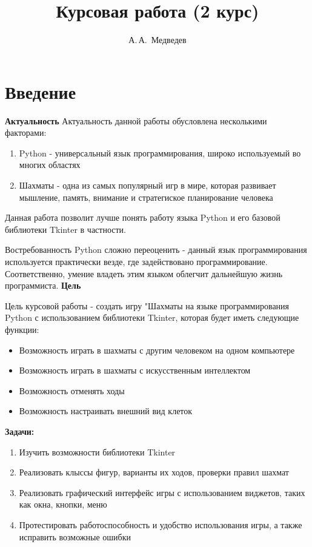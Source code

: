 \documentclass[14pt, oneside]{altsu-report}
\title{Курсовая работа (2 курс)}
\author{А.\,А.~Медведев}
\institute{Институт цифровых технологий, электроники и физики}
\date{\the\year}
\begin{document}
\maketitle

\setcounter{page}{2}
\makeabstract
\tableofcontents

\chapter*{Введение}

\textbf{Актуальность}
Актуальность данной работы обусловлена несколькими факторами:
\begin{enumerate}
    \item Python - универсальный язык программирования, широко используемый во многих областях
    \item Шахматы - одна из самых популярный игр в мире, которая развивает мышление, память, внимание и стратегиское планирование человека
\end{enumerate}

Данная работа позволит лучше понять работу языка Python и его базовой библиотеки Tkinter в частности.

Востребованность Python сложно переоценить - данный язык программирования используется практически везде, где задействовано программирование. Соответственно, умение владеть этим языком облегчит дальнейшую жизнь программиста.
\textbf{Цель}

Цель курсовой работы - создать игру "Шахматы на языке программирования Python с использованием библиотеки Tkinter, которая будет иметь следующие функции:
\begin{itemize}
    \item Возможность играть в шахматы с другим человеком на одном компьютере
    \item Возможность играть в шахматы с искусственным интеллектом
    \item Возможность отменять ходы
    \item Возможность настраивать внешний вид клеток
\end{itemize}
\textbf{Задачи:}
\begin{enumerate}
\item Изучить возможности библиотеки Tkinter
\item Реализовать клыссы фигур, варианты их ходов, проверки правил шахмат
\item Реализовать графический интерфейс игры с использованием виджетов, таких как окна, кнопки, меню
\item Протестировать работоспособность и удобство использования игры, а также исправить возможные ошибки 
\end{enumerate}
\end{document}
